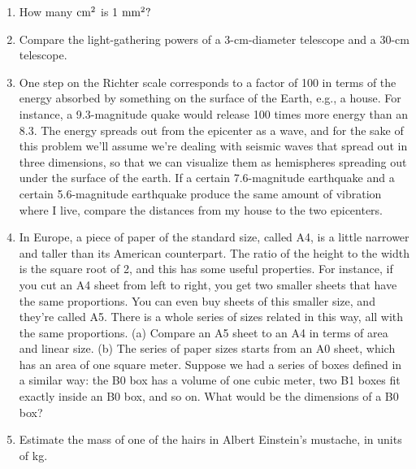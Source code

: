 \begin{enumerate}
\item 
  How many $\textup{cm}^2$ is 1 $\textup{mm}^2?$

\item 
  Compare the light-gathering powers of a 3-cm-diameter
telescope and a 30-cm telescope.

\item   One step on the Richter scale corresponds to a
factor of 100 in terms of the energy absorbed by something
on the surface of the Earth, e.g., a house. For instance, a
9.3-magnitude quake would release 100 times more energy than
an 8.3. The energy spreads out from the epicenter as a wave,
and for the sake of this problem we'll assume we're dealing
with seismic waves that spread out in three dimensions, so
that we can visualize them as hemispheres spreading out
under the surface of the earth. If a certain 7.6-magnitude
earthquake and a certain 5.6-magnitude earthquake produce
the same amount of vibration where I live, compare the
distances from my house to the two epicenters.

\item 
 In Europe, a piece of paper of the standard size,
called A4, is a little narrower and taller than its American
counterpart. The ratio of the height to the width is the
square root of 2, and this has some useful properties. For
instance, if you cut an A4 sheet from left to right, you get
two smaller sheets that have the same proportions. You can
even buy sheets of this smaller size, and they're called A5.
There is a whole series of sizes related in this way, all
with the same proportions. (a) Compare an A5 sheet to an A4
in terms of area and linear size. (b) The series of paper
sizes starts from an A0 sheet, which has an area of one
square meter. Suppose we had a series of boxes defined in a
similar way: the B0 box has a volume of one cubic meter, two
B1 boxes fit exactly inside an B0 box, and so on. What would
be the dimensions of a B0 box? 

\vspace{1.5mm}
\item 
 Estimate the mass of one of the hairs in Albert
Einstein's mustache, in units of kg.
\label{hw:hairmass}




\end{enumerate}
